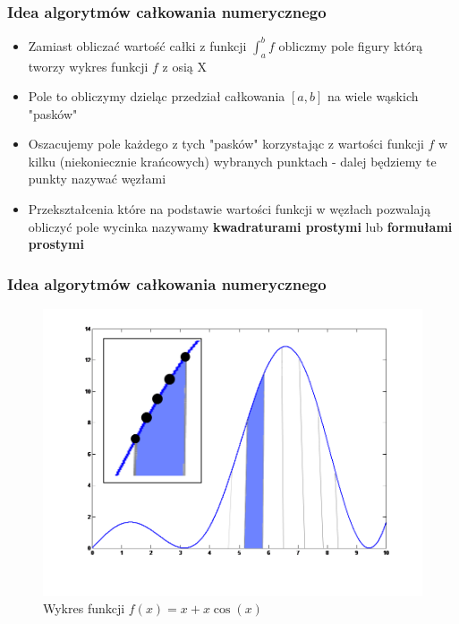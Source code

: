 \documentclass[compress,red]{beamer}
\begin{document}
	\begin{frame}
		\frametitle{Idea algorytmów całkowania numerycznego}
		\begin{itemize}
			\item
			 	Zamiast obliczać wartość całki z funkcji $\int_a^b f$ obliczmy pole 
			 	figury którą tworzy wykres funkcji $f$ z osią X
			 \item
			 	Pole to obliczymy dzieląc przedział całkowania $[a, b]$ na
			 	wiele wąskich "pasków"
			 \item
			 	Oszacujemy pole każdego z tych "pasków" korzystając z 
			 	wartości funkcji $f$ w kilku (niekoniecznie krańcowych) wybranych
			 	punktach - dalej będziemy te punkty nazywać węzłami
			 \item
			 	Przekształcenia które na podstawie wartości funkcji w węzłach
			 	pozwalają obliczyć pole wycinka nazywamy \textbf{kwadraturami prostymi}
			 	lub \textbf{formułami prostymi}
		\end{itemize}
	\end{frame}
	
	\begin{frame}
		\frametitle{Idea algorytmów całkowania numerycznego}
		\begin{figure}
			\includegraphics[scale=0.3,trim=1cm 1cm 1cm 1cm,clip]{./img/integration_idea}
			\caption{Wykres funkcji $f(x) = x + x\cos(x)$}
		\end{figure}
	\end{frame}	
	
\end{document}
